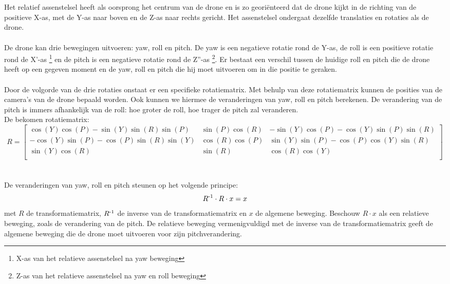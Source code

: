 \\
\\
Het relatief assenstelsel heeft als oorsprong het centrum van de drone en is zo georiënteerd dat de drone kijkt in de richting van de positieve X-as, met de Y-as naar boven en de Z-as naar rechts gericht. Het assenstelsel ondergaat dezelfde translaties en rotaties als de drone.
\\
\\
De drone kan drie bewegingen uitvoeren: yaw, roll en pitch. De yaw is een negatieve rotatie rond de Y-as, de roll is een positieve rotatie rond de X'-as \footnote{X-as van  het relatieve assenstelsel na yaw beweging} en de pitch is een negatieve rotatie rond de Z''-as \footnote{Z-as van het relatieve assenstelsel na yaw en roll beweging}. Er bestaat een verschil tussen de huidige roll en pitch die de drone heeft op een gegeven moment en de yaw, roll en pitch die hij moet uitvoeren om in die positie te geraken.  
\\
\\
Door de volgorde van de drie rotaties onstaat er een specifieke rotatiematrix. Met behulp van deze rotatiematrix kunnen de posities van de camera's van de drone bepaald worden. Ook kunnen we hiermee de veranderingen van yaw, roll en pitch berekenen. De verandering van de pitch is immers afhankelijk van de roll: hoe groter de roll, hoe trager de pitch zal veranderen.
\\
De bekomen rotatiematrix: 
\begin{equation*}
R = 
\begin{bmatrix}
\cos(Y)\cos(P) -\sin(Y)\sin(R)\sin(P) & \sin(P)\cos(R) & -\sin(Y)\cos(P) - \cos(Y)\sin(P)\sin(R)\\
-\cos(Y)\sin(P) - \cos(P)\sin(R)\sin(Y) & \cos(R)\cos(P) & \sin(Y)\sin(P) - \cos(P)\cos(Y)\sin(R) \\ 
\sin(Y)\cos(R) & \sin(R) & \cos(R)\cos(Y)\\
\end{bmatrix} \label{rotatiematrix}
\end{equation*}
\\
\\
De veranderingen van yaw, roll en pitch steunen op het volgende principe:
\begin{equation*}
R\textsuperscript{-1} \cdot R \cdot x = x \label{rotatieBewegingVergelijking}
\end{equation*}
met \(R\) de transformatiematrix, \(R\textsuperscript{-1}\) de inverse van de transformatiematrix en \(x\) de algemene beweging. Beschouw \(R \cdot x\) als een relatieve beweging, zoals de verandering van de pitch. De relatieve beweging vermenigvuldigd met de inverse van de transformatiematrix geeft de algemene beweging die de drone moet uitvoeren voor zijn pitchverandering.

